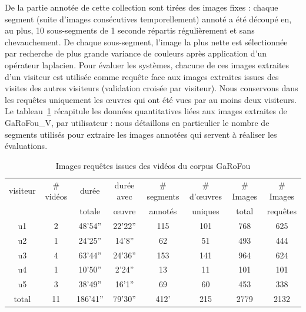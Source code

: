 De la partie annotée de cette collection sont tirées des images fixes : chaque segment (suite d'images consécutives temporellement) annoté a été découpé en, au plus, 10 sous-segments de 1 seconde répartis régulièrement et sans chevauchement. De chaque sous-segment, l'image la plus nette est sélectionnée par recherche de plus grande variance de couleurs après application d'un opérateur laplacien. Pour évaluer les systèmes, chacune de ces images extraites d'un visiteur est utilisée comme requête face aux images extraites issues des visites des autres visiteurs (validation croisée par visiteur). Nous conservons dans les requêtes uniquement les œuvres qui ont été vues par au moins deux visiteurs. 
Le tableau~\ref{tab:video_garofou_visiteur} récapitule les données quantitatives liées aux images extraites de GaRoFou\_V, par utilisateur : nous détaillons en particulier le nombre de segments utilisés pour extraire les images annotées qui servent à réaliser les évaluations.

\begin{table}[htb]
    \centering
    \begin{tabular}{| c | c | c | c | c | c | c | c | }
    \hline 
    visiteur & \# vidéos & durée   & durée avec &\# segments   & \# d'œuvres & \# Images & \# Images \\
      	     &           & totale  & œuvre      & annotés    & uniques     & total     & requêtes  \\
    \hline    
    \hline    
    u1       & 2         & 48'54'' & 22'22''    & 115        & 101        & 768       & 625       \\
    u2       & 1         & 24'25'' & 14'8''     & 62         & 51         & 493       & 444       \\ 
    u3       & 4         & 63'44'' & 24'36''    & 153        & 141        & 964       & 624       \\ 
    u4       & 1         & 10'50'' & 2'24''     & 13         & 11         & 101       & 101       \\ 
    u5       & 3         & 38'49'' & 16'1''     & 69         & 60         & 453       & 338       \\
    \hline
    total    & 11        & 186'41''& 79'30''    & 412'       & 215        & 2779      & 2132      \\
    \hline
    \end{tabular}
    \caption{Images requêtes issues des vidéos du corpus GaRoFou}
    \label{tab:video_garofou_visiteur}
\end{table}

